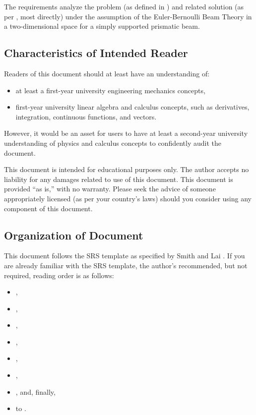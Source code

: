 \documentclass[12pt]{article}
\begin{document}
The requirements analyze the problem (as defined in ) and related
solution (as per , most directly) under the assumption of the
Euler-Bernoulli Beam Theory \cite{EulerBernoulliWiki} in a two-dimensional space
for a simply supported prismatic beam.

\subsection{Characteristics of Intended Reader}
\label{sec_IntendedReader}

Readers of this document should at least have an understanding of:
\begin{itemize}

    \item at least a first-year university engineering mechanics concepts,

    \item first-year university linear algebra and calculus concepts, such as
          derivatives, integration, continuous functions, and vectors.

\end{itemize}

However, it would be an asset for users to have at least a second-year
university understanding of physics and calculus concepts to confidently audit
the document.

This document is intended for educational purposes only. The author accepts no
liability for any damages related to use of this document. This document is
provided ``as is,'' with no warranty. Please seek the advice of someone
appropriately licensed (as per your country's laws) should you consider using
any component of this document.

\subsection{Organization of Document}

This document follows the SRS template as specified by Smith and Lai
\cite{SmithAndLai2005}. If you are already familiar with the SRS template, the
author's recommended, but not required, reading order is as follows:

\begin{itemize}
    \item {},
    \item {},
    \item {},
    \item {},
    \item {},
    \item {},
    \item {}, and, finally,
    \item {} to .
\end{itemize}
\end{document}
